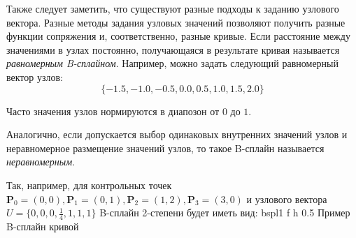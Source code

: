 \documentclass{bmstu}
\begin{document}
Также следует заметить, что существуют разные подходы к заданию узлового вектора. Разные методы задания узловых значений позволяют получить разные
функции сопряжения и, соответственно, разные кривые. Если расстояние
между значениями в узлах постоянно, получающаяся в результате кривая
называется \textit{равномерным B-сплайном}. Например, можно задать
следующий равномерный вектор узлов:
\[
  \{-1.5, -1.0, -0.5, 0.0, 0.5, 1.0, 1.5, 2.0\}  
\]

Часто значения узлов нормируются в диапозон от $0$ до $1$.

Аналогично, если допускается выбор одинаковых внутренних значений узлов и
неравномерное размещение значений узлов, то такое B-сплайн называется \textit{неравномерным}.

Так, например, для контрольных точек $\mathbf{P}_0 = (0,0), \mathbf{P}_1 = (0,1), \mathbf{P}_2 = (1,2), \mathbf{P}_3 = (3,0)$ и узлового вектора $U=\{0,0,0,\frac{1}4,1,1,1\}$ B-сплайн 2-степени будет иметь вид:
{bspl1} %
{f} %
{h} %
{0.5\textwidth} %
{Пример B-сплайн кривой} %
\end{document}
